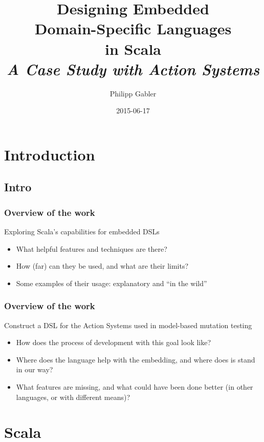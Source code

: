 \documentclass{beamer}
\author{Philipp Gabler}
\title{Designing Embedded\\ Domain-Specific Languages\\ in Scala\\
  {\small\itshape A Case Study with Action Systems}}
\date{2015-06-17}
\begin{document}
\begin{frame}
  \maketitle
\end{frame}

\section{Introduction}
\subsection{Intro}

\begin{frame}
  \frametitle{Overview of the work}
  \begin{block}{Exploring Scala's capabilities for embedded DSLs}
    \begin{itemize}
    \item What helpful features and techniques are there?
    \item How (far) can they be used, and what are their limits?
    \item Some examples of their usage: explanatory and \enquote{in the wild}
    \end{itemize}
  \end{block}
\end{frame}

\begin{frame}
  \frametitle{Overview of the work}
  \begin{block}{Construct a DSL for the Action Systems used in model-based mutation testing}
    \begin{itemize}
    \item How does the process of development with this goal look like?
    \item Where does the language help with the embedding, and where does is stand in our way?
    \item What features are missing, and what could have been done better (in other languages, or
      with different means)?
    \end{itemize}
  \end{block}
\end{frame}

\section{Scala}
\end{document}
